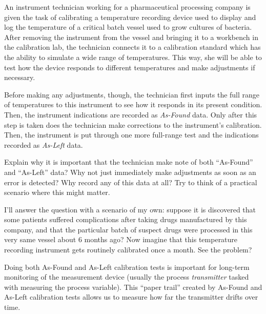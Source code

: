 

An instrument technician working for a pharmaceutical processing company is given the task of calibrating a temperature recording device used to display and log the temperature of a critical batch vessel used to grow cultures of bacteria.  After removing the instrument from the vessel and bringing it to a workbench in the calibration lab, the technician connects it to a calibration standard which has the ability to simulate a wide range of temperatures.  This way, she will be able to test how the device responds to different temperatures and make adjustments if necessary.

Before making any adjustments, though, the technician first inputs the full range of temperatures to this instrument to see how it responds in its present condition.  Then, the instrument indications are recorded as {\it As-Found} data.  Only after this step is taken does the technician make corrections to the instrument's calibration.  Then, the instrument is put through one more full-range test and the indications recorded as {\it As-Left} data.

Explain why it is important that the technician make note of both ``As-Found'' and ``As-Left'' data?  Why not just immediately make adjustments as soon as an error is detected?  Why record any of this data at all?  Try to think of a practical scenario where this might matter.







I'll answer the question with a scenario of my own: suppose it is discovered that some patients suffered complications after taking drugs manufactured by this company, and that the particular batch of suspect drugs were processed in this very same vessel about 6 months ago?  Now imagine that this temperature recording instrument gets routinely calibrated once a month.  See the problem?







Doing both As-Found and As-Left calibration tests is important for long-term monitoring of the measurement device (usually the process {\it transmitter} tasked with measuring the process variable).  This ``paper trail'' created by As-Found and As-Left calibration tests allows us to measure how far the transmitter drifts over time.

